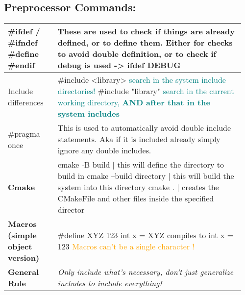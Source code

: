 \documentclass[main.tex,fontsize=8pt,paper=a4,paper=portrait,DIV=calc,]{scrartcl}
\begin{document}
\begin{table}[ht!]
\subsection{Preprocessor Commands:}
\begin{tabular}{|m{0.2\linewidth}|m{0.755\linewidth}|}
\hline
\#ifdef / \#ifndef \newline \#define \newline \#endif & These are used to check if things are already defined, or to define them. Either for checks to avoid double definition, or to check if debug is used -> ifdef DEBUG\\
\hline
Include differences & \#include <library> \textcolor{teal}{search in the system include directories!}\newline
\#include "library" \textcolor{teal}{search in the current working directory, \textbf{AND after that in the system includes}}\\
\hline
\#pragma once & This is used to automatically avoid double include statements. Aka if it is included already simply ignore any double includes. \\
\hline
\textbf{Cmake} & cmake -B build | this will define the directory to build in \newline cmake --build directory | this will build the system into this directory \newline cmake . | creates the CMakeFile and other files inside the specified director
\\
\hline
\textbf{Macros (simple object version)} & 
\#define XYZ 123 \newline
int x = XYZ compiles to int x = 123\newline 
\textcolor{orange}{Macros can't be a single character !}\\
\hline
\textbf{General Rule} & \emph{Only include what's necessary, don't just generalize includes to include everything!}\\
\hline
\end{tabular}

\end{table}
\end{document}
